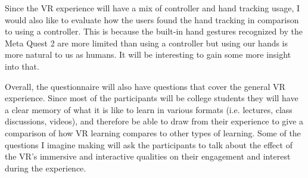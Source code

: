 \documentclass[11pt,twocolumn]{article}
\begin{document}
Since the VR experience will have a mix of controller and hand tracking usage, I would also like to evaluate how the users found the hand tracking in comparison to using a controller. This is because the built-in hand gestures recognized by the Meta Quest 2 are more limited than using a controller but using our hands is more natural to us as humans. It will be interesting to gain some more insight into that. 
 
Overall, the questionnaire will also have questions that cover the general VR experience. Since most of the participants will be college students they will have a clear memory of what it is like to learn in various formats (i.e. lectures, class discussions, videos), and therefore be able to draw from their experience to give a comparison of how VR learning compares to other types of learning. Some of the questions I imagine making will ask the participants to talk about the effect of the VR's immersive and interactive qualities on their engagement and interest during the experience. 
\end{document}
